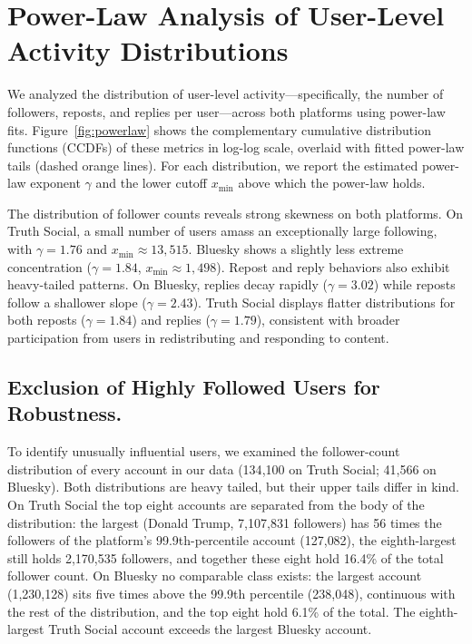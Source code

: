\documentclass[letterpaper]{article} %
\newcommand{\rev}[1]{{\color{blue}#1}}
\begin{document}
\appendix
\setcounter{table}{0}\setcounter{figure}{0}
\renewcommand{\thetable}{A\arabic{table}}\renewcommand{\thefigure}{A\arabic{figure}}

\section{Power-Law Analysis of User-Level Activity Distributions}
\label{app:powerlaw}
We analyzed the distribution of user-level activity—specifically, the number of followers, reposts, and replies per user—across both platforms using power-law fits. Figure~\ref{fig:powerlaw} shows the complementary cumulative distribution functions (CCDFs) of these metrics in log-log scale, overlaid with fitted power-law tails (dashed orange lines). For each distribution, we report the estimated power-law exponent $\gamma$ and the lower cutoff $x_{\min}$ above which the power-law holds.

The distribution of follower counts reveals strong skewness on both platforms. On Truth Social, a small number of users amass an exceptionally large following, with $\gamma = 1.76$ and $x_{\min} \approx 13{,}515$. Bluesky shows a slightly less extreme concentration ($\gamma = 1.84$, $x_{\min} \approx 1{,}498$). Repost and reply behaviors also exhibit heavy-tailed patterns. On Bluesky, replies decay rapidly ($\gamma = 3.02$) while reposts follow a shallower slope ($\gamma = 2.43$). Truth Social displays flatter distributions for both reposts ($\gamma = 1.84$) and replies ($\gamma = 1.79$), consistent with broader participation from users in redistributing and responding to content.

\subsection*{Exclusion of Highly Followed Users for Robustness.}
To identify unusually influential users, we examined the follower-count distribution of every account in our data \rev{(134{,}100 on Truth Social; 41{,}566 on Bluesky). Both distributions are heavy tailed, but their upper tails differ in kind. On Truth Social the top eight accounts are separated from the body of the distribution: the largest (Donald Trump, 7{,}107{,}831 followers) has 56 times the followers of the platform's 99.9th-percentile account (127{,}082), the eighth-largest still holds 2{,}170{,}535 followers, and together these eight hold 16.4\% of the total follower count. On Bluesky no comparable class exists: the largest account (1{,}230{,}128) sits five times above the 99.9th percentile (238{,}048), continuous with the rest of the distribution, and the top eight hold 6.1\% of the total. The eighth-largest Truth Social account exceeds the largest Bluesky account.}
\end{document}
